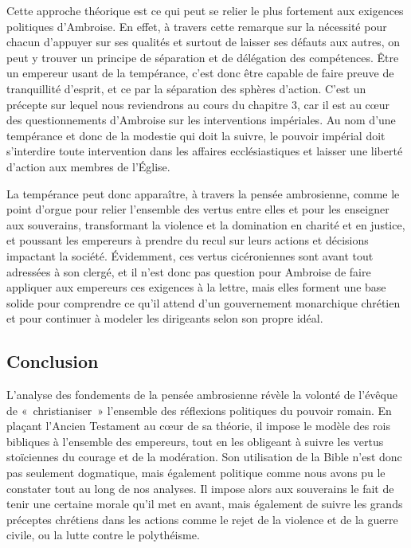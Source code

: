 Cette approche théorique est ce qui peut se relier le plus fortement aux exigences politiques d'Ambroise. En effet, à travers cette remarque sur la nécessité pour chacun d'appuyer sur ses qualités et surtout de laisser ses défauts aux autres, on peut y trouver un principe de séparation et de délégation des compétences. Être un empereur usant de la tempérance, c'est donc être capable de faire preuve de tranquillité d'esprit, et ce par la séparation des sphères d'action. C'est un précepte sur lequel nous reviendrons au cours du chapitre 3, car il est au cœur des questionnements d'Ambroise sur les interventions impériales. Au nom d'une tempérance et donc de la modestie qui doit la suivre, le pouvoir impérial doit s'interdire toute intervention dans les affaires ecclésiastiques et laisser une liberté d'action aux membres de l'Église.

\bigskip

La tempérance peut donc apparaître, à travers la pensée ambrosienne, comme le point d’orgue pour relier l’ensemble des vertus entre elles et pour les enseigner aux souverains, transformant la violence et la domination en charité et en justice, et poussant les empereurs à prendre du recul sur leurs actions et décisions impactant la société. Évidemment, ces vertus cicéroniennes sont avant tout adressées à son clergé, et il n'est donc pas question pour Ambroise de faire appliquer aux empereurs ces exigences à la lettre, mais elles forment une base solide pour comprendre ce qu'il attend d'un gouvernement monarchique chrétien et pour continuer à modeler les dirigeants selon son propre idéal.

\bigskip

\subsection*{Conclusion}

L’analyse des fondements de la pensée ambrosienne révèle la volonté de l'évêque de «~christianiser~» l'ensemble des réflexions politiques du pouvoir romain. En plaçant l'Ancien Testament au cœur de sa théorie, il impose le modèle des rois bibliques à l'ensemble des empereurs, tout en les obligeant à suivre les vertus stoïciennes du courage et de la modération. Son utilisation de la Bible n'est donc pas seulement dogmatique, mais également politique comme nous avons pu le constater tout au long de nos analyses. Il impose alors aux souverains le fait de tenir une certaine morale qu'il met en avant, mais également de suivre les grands préceptes chrétiens dans les actions comme le rejet de la violence et de la guerre civile, ou la lutte contre le polythéisme.

